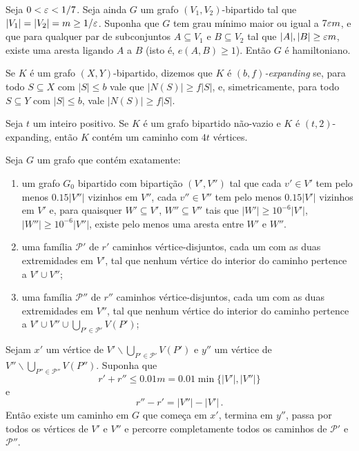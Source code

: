 \begin{lema}\label{lema:haxell}
	Seja $0<\varepsilon<1/7$. Seja ainda $G$ um grafo $(V_1, V_2)$-bipartido tal que $|V_1| = |V_2| = m\geq1/\varepsilon$. Suponha que $G$ tem grau mínimo maior ou igual a $7\varepsilon m$, e que para qualquer par de subconjuntos $A\subseteq V_1$ e $B\subseteq V_2$ tal que $|A|,|B|\geq \varepsilon m$, existe uma aresta ligando $A$ a $B$ (isto é, $e(A, B)\geq1$). Então $G$ é hamiltoniano.
\end{lema}

\begin{defi}
	Se $K$ é um grafo $(X,Y)$-bipartido, dizemos que $K$ é \emph{$(b,f)$-expanding} se, para todo $S\subseteq X$ com $|S|\leq b$ vale que $|N(S)|\geq f|S|$, e, simetricamente, para todo $S\subseteq Y$ com $|S|\leq b$, vale $|N(S)|\geq f|S|$.
\end{defi}

\begin{prop}
	Seja $t$ um inteiro positivo. Se $K$ é um grafo bipartido não-vazio e $K$ é $(t,2)$-expanding, então $K$ contém um caminho com $4t$ vértices.
\end{prop}

\begin{lema}
	Seja $G$ um grafo que contém exatamente:
	\begin{enumerate}
		\item \label{item:regularidade}um grafo $G_0$ bipartido com bipartição $(V',V'')$ tal que cada $v'\in V'$ tem pelo menos $0.15|V''|$ vizinhos em $V''$, cada $v''\in V''$ tem pelo menos $0.15|V'|$ vizinhos em $V'$ e, para quaisquer $W'\subseteq V'$, $W''\subseteq V''$ tais que $|W'|\geq10^{-6}|V'|$, $|W''|\geq10^{-6}|V''|$, existe pelo menos uma aresta entre $W'$ e $W''$.
		\item uma família $\mathcal{P}'$ de $r'$ caminhos vértice-disjuntos, cada um com as duas extremidades em $V'$, tal que nenhum vértice do interior do caminho pertence a $V'\cup V''$;
		\item uma família $\mathcal{P}''$ de $r''$ caminhos vértice-disjuntos, cada um com as duas extremidades em $V''$, tal que nenhum vértice do interior do caminho pertence a $V'\cup V''\cup \bigcup_{P'\in \mathcal{P}'}V(P')$;
	\end{enumerate}
	Sejam $x'$ um vértice de $V'\backslash \bigcup_{P'\in \mathcal{P}'}V(P')$ e $y''$ um vértice de $V''\backslash \bigcup_{P''\in \mathcal{P}''}V(P'')$. Suponha que 
	\[
	r' + r''\leq 0.01m = 0.01\min\{|V'|, |V''|\}
	\]
	e 
	\[
	r'' - r' = |V''| - |V'|\,. 
	\]
	Então existe um caminho em $G$ que começa em $x'$, termina em $y''$, passa por todos os vértices de $V'$ e $V''$ e percorre completamente todos os caminhos de $\mathcal{P}'$ e $\mathcal{P}''$. 
\end{lema}

